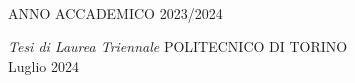 \documentclass[
11pt, %
italian, 
singlespacing, %
headsepline, %
]{MastersDoctoralThesis} %
\theoremstyle{plain}
\theoremstyle{definition}
\theoremstyle{remark}
\begin{document}
\begin{titlepage}
\begin{center}
		\vfill
  
		\vfill
		\HRule \\[1cm] %
		{\large ANNO ACCADEMICO 2023/2024 }\\[4cm] 
		
		\vfill
	\end{center}


\cleardoublepage



	\begin{center}
 
		\vspace{21cm}
		\makeatletter
		\large\textrm{\authorname}
		\makeatother
		\vspace{8.85cm}
		\begin{center}
			\makeatletter
			\singlespacing\Huge\textsc{\ttitle}
			\makeatother
		\end{center}%
		\vspace{0.4cm}
		\makeatletter
		\large\textit{Tesi di Laurea Triennale}
		\makeatother
		\vfill
		\large POLITECNICO DI TORINO\\
		\vspace{1cm}
		\makeatletter
		\large\textrm{Luglio 2024} %
		\makeatother
	\end{center}
\end{titlepage}

\restoregeometry

\pagestyle{plain} %

\frontmatter %

\tableofcontents %

\listoffigures %

\end{document}
